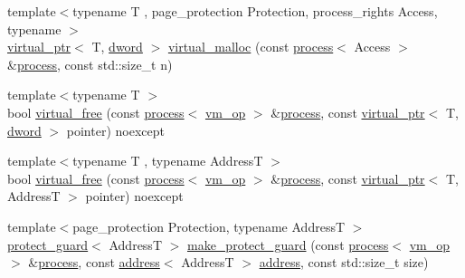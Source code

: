 \begin{DoxyCompactItemize}
\item 
{\footnotesize template$<$typename T , page\+\_\+protection Protection, process\+\_\+rights Access, typename $>$ }\\\mbox{\hyperlink{classdistant_1_1memory_1_1virtual__ptr}{virtual\+\_\+ptr}}$<$ T, \mbox{\hyperlink{namespacedistant_a9fa41a5a1a17dcbd24da1c1855c92489}{dword}} $>$ \mbox{\hyperlink{namespacedistant_1_1memory_a3737676d3de70913b89d7c1dcd91739f}{virtual\+\_\+malloc}} (const \mbox{\hyperlink{classdistant_1_1kernel__objects_1_1process}{process}}$<$ Access $>$ \&\mbox{\hyperlink{classdistant_1_1kernel__objects_1_1process}{process}}, const std\+::size\+\_\+t n)
\item 
{\footnotesize template$<$typename T $>$ }\\bool \mbox{\hyperlink{namespacedistant_1_1memory_acd6d17802cc6c8b096b24c6fc7818f2d}{virtual\+\_\+free}} (const \mbox{\hyperlink{classdistant_1_1kernel__objects_1_1process}{process}}$<$ \mbox{\hyperlink{namespacedistant_af02d4223cd2f509cc373ac9d83655f19}{vm\+\_\+op}} $>$ \&\mbox{\hyperlink{classdistant_1_1kernel__objects_1_1process}{process}}, const \mbox{\hyperlink{classdistant_1_1memory_1_1virtual__ptr}{virtual\+\_\+ptr}}$<$ T, \mbox{\hyperlink{namespacedistant_a9fa41a5a1a17dcbd24da1c1855c92489}{dword}} $>$ pointer) noexcept
\item 
{\footnotesize template$<$typename T , typename AddressT $>$ }\\bool \mbox{\hyperlink{namespacedistant_1_1memory_a08a756a4933a9202174e3ecbc91a9f26}{virtual\+\_\+free}} (const \mbox{\hyperlink{classdistant_1_1kernel__objects_1_1process}{process}}$<$ \mbox{\hyperlink{namespacedistant_af02d4223cd2f509cc373ac9d83655f19}{vm\+\_\+op}} $>$ \&\mbox{\hyperlink{classdistant_1_1kernel__objects_1_1process}{process}}, const \mbox{\hyperlink{classdistant_1_1memory_1_1virtual__ptr}{virtual\+\_\+ptr}}$<$ T, AddressT $>$ pointer) noexcept
\item 
{\footnotesize template$<$page\+\_\+protection Protection, typename AddressT $>$ }\\\mbox{\hyperlink{classdistant_1_1memory_1_1protect__guard}{protect\+\_\+guard}}$<$ AddressT $>$ \mbox{\hyperlink{namespacedistant_1_1memory_a6021f7cb185a7211fdfd784beb072cce}{make\+\_\+protect\+\_\+guard}} (const \mbox{\hyperlink{classdistant_1_1kernel__objects_1_1process}{process}}$<$ \mbox{\hyperlink{namespacedistant_af02d4223cd2f509cc373ac9d83655f19}{vm\+\_\+op}} $>$ \&\mbox{\hyperlink{classdistant_1_1kernel__objects_1_1process}{process}}, const \mbox{\hyperlink{classdistant_1_1memory_1_1address}{address}}$<$ AddressT $>$ \mbox{\hyperlink{classdistant_1_1memory_1_1address}{address}}, const std\+::size\+\_\+t size)

\end{DoxyCompactItemize}
